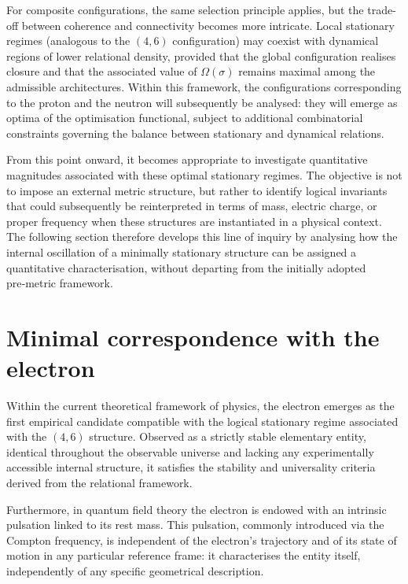 \documentclass[11pt,a4paper]{article}
\begin{document}
For composite configurations, the same selection principle applies, but the trade-off between coherence and connectivity becomes more intricate. Local stationary regimes (analogous to the \((4,6)\) configuration) may coexist with dynamical regions of lower relational density, provided that the global configuration realises closure and that the associated value of \(\Omega(\sigma)\) remains maximal among the admissible architectures. Within this framework, the configurations corresponding to the proton and the neutron will subsequently be analysed: they will emerge as optima of the optimisation functional, subject to additional combinatorial constraints governing the balance between stationary and dynamical relations.

From this point onward, it becomes appropriate to investigate quantitative magnitudes associated with these optimal stationary regimes. The objective is not to impose an external metric structure, but rather to identify logical invariants that could subsequently be reinterpreted in terms of mass, electric charge, or proper frequency when these structures are instantiated in a physical context. The following section therefore develops this line of inquiry by analysing how the internal oscillation of a minimally stationary structure can be assigned a quantitative characterisation, without departing from the initially adopted pre‑metric framework.

\section{Minimal correspondence with the electron}
Within the current theoretical framework of physics, the electron emerges as the first empirical candidate compatible with the logical stationary regime associated with the \((4,6)\) structure. Observed as a strictly stable elementary entity, identical throughout the observable universe and lacking any experimentally accessible internal structure, it satisfies the stability and universality criteria derived from the relational framework.

Furthermore, in quantum field theory the electron is endowed with an intrinsic pulsation linked to its rest mass. This pulsation, commonly introduced via the Compton frequency, is independent of the electron’s trajectory and of its state of motion in any particular reference frame: it characterises the entity itself, independently of any specific geometrical description.
\end{document}
